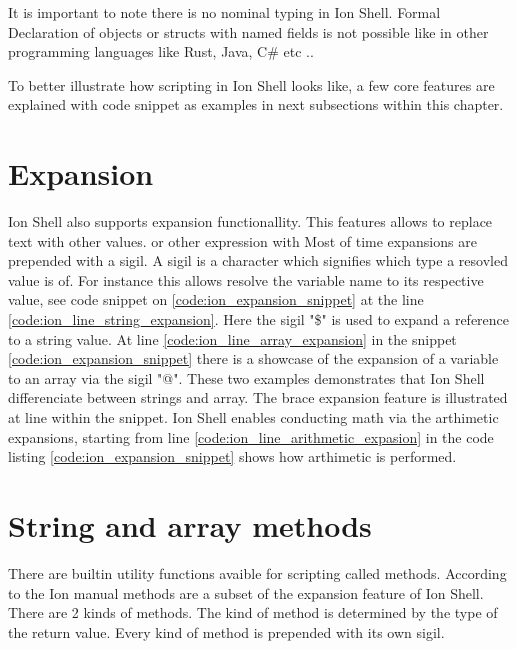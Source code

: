 It is important to note there is no nominal typing in Ion Shell.
Formal Declaration of objects or structs with named fields is not possible like in other programming languages like Rust, Java, C\# etc ..

To better illustrate how scripting in Ion Shell looks like, a few core features are explained
with code snippet as examples in next subsections within this chapter.

\clearpage

\section{Expansion}\label{ion_shell_lang_expansion}

Ion Shell also supports expansion functionallity.
This features allows to replace text with other values. or other expression with
Most of time expansions are prepended with a sigil.
A sigil is a character which signifies which type a resovled value is of.
For instance this allows resolve the variable name to its respective value, see code snippet
on \ref{code:ion_expansion_snippet} at the line \ref{code:ion_line_string_expansion}.
Here the sigil "\$" is used to expand a reference to a string value.
At line \ref{code:ion_line_array_expansion} in the snippet \ref{code:ion_expansion_snippet}
there is a showcase of the expansion of a variable to an array via the sigil "@".
These two examples demonstrates that Ion Shell differenciate between strings and array.
The brace expansion feature is illustrated at line within the snippet.
Ion Shell enables conducting math via the arthimetic expansions,
starting from line \ref{code:ion_line_arithmetic_expasion} in the code listing \ref{code:ion_expansion_snippet} shows how arthimetic is performed.


\clearpage

\section{String and array methods}\label{ion_shell_lang_methods}

There are builtin utility functions avaible for scripting called methods.
According to the Ion manual methods are a subset of the expansion feature of Ion Shell.
There are 2 kinds of methods.
The kind of method is determined by the type of the return value.
Every kind of method is prepended with its own sigil.


